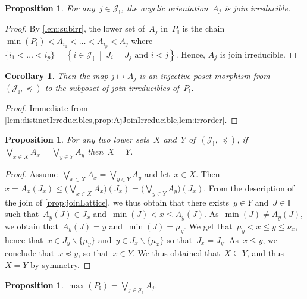 \documentclass[reqno]{amsart}
\newtheorem{corollary}[theorem]{Corollary}
\newtheorem{proposition}[theorem]{Proposition}
\theoremstyle{definition}
\newcommand{\cal}[1]{\mathcal{#1}} %
\newcommand{\set}[2]{\left\{ #1 \;\middle|\; #2 \right\}} %
\newcommand{\ssm}{\smallsetminus} %
\newcommand{\bigJoin}{\bigvee} %
\newcommand{\II}{\mathbb I} %
\newcommand{\cJ}{\cal{J}} %
\begin{document}
\begin{proposition}
\label{prop:AjJoinIrreducible}
For any~$j\in \cJ_\II$, the acyclic orientation~$A_j$ is join irreducible.
\end{proposition}

\begin{proof}
By \cref{lem:subirr}, the lower set of~$A_j$ in~$P_\II$ is the chain $\min(P_\II) < A_{i_1} < \dots < A_{i_p} < A_j$ where~$\{i_1 < \dots < i_p\} = \set{i \in \cJ_\II}{J_i = J_j \text{ and } i < j}$.
Hence, $A_j$ is join irreducible.
\end{proof}

\begin{corollary}
\label{coro:irreduciblePosetMorphism}
Then the map $j \mapsto A_j$ is an injective poset morphism from~$(\cJ_\II, \preccurlyeq)$ to the subposet of join irreducibles of~$P_\II$.
\end{corollary}

\begin{proof}
Immediate from \cref{lem:distinctIrreducibles,prop:AjJoinIrreducible,lem:irrorder}.
\end{proof}

\begin{proposition}
\label{prop:injectivityDistributive}
For any two lower sets~$X$ and~$Y$ of~$(\cJ_\II, \preccurlyeq)$, if~$\bigJoin\limits_{x \in X} A_x = \bigJoin\limits_{y \in Y} A_y$ then~$X = Y$.
\end{proposition}

\begin{proof}
Assume~$\bigJoin\limits_{x \in X} A_x = \bigJoin\limits_{y \in Y} A_y$ and let~$x \in X$.
Then $x = A_x(J_x) \le \big( \bigJoin\limits_{x \in X} A_x \big)(J_x) = \big( \bigJoin\limits_{y \in Y} A_y \big)(J_x)$.
From the description of the join of \cref{prop:joinLattice}, we thus obtain that there exists~$y \in Y$ and~$J \in \II$ such that~$A_y(J) \in J_x$ and~$\min(J) < x \le A_y(J)$.
As~$\min(J) \ne A_y(J)$, we obtain that~$A_y(J) = y$ and~$\min(J) = \mu_y$.
We get that~$\mu_y < x \le y \le \nu_x$, hence that~$x \in J_y \ssm \{\mu_y\}$ and~$y \in J_x \ssm \{\mu_x\}$ so that~$J_x = J_y$.
As~$x \le y$, we conclude that~$x \preccurlyeq y$, so that~$x \in Y$.
We thus obtained that~$X \subseteq Y$, and thus~$X = Y$ by symmetry.
\end{proof}

\begin{proposition}
$\displaystyle \max(P_\II) = \bigJoin\limits_{j \in \cJ_\II} A_j$.
\end{proposition}
\end{document}
